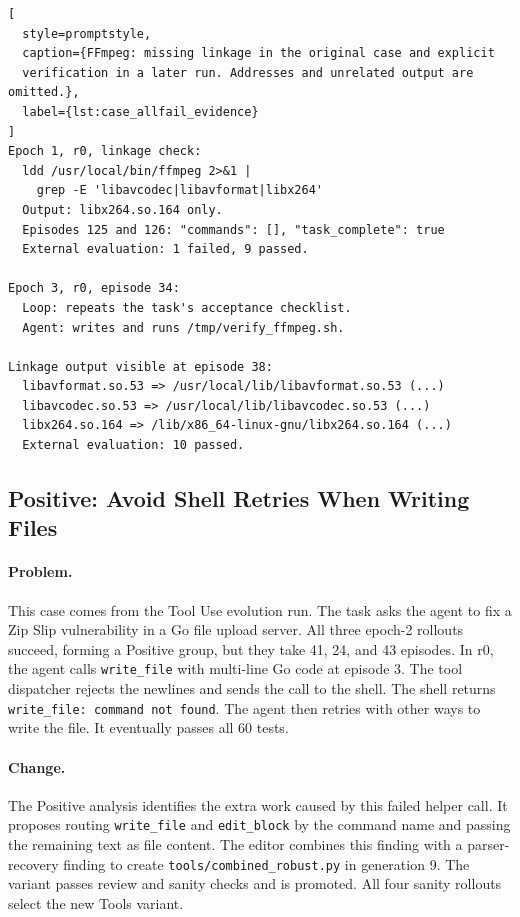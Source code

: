 \documentclass{article} %
\begin{document}
\begin{lstlisting}[
  style=promptstyle,
  caption={FFmpeg: missing linkage in the original case and explicit
  verification in a later run. Addresses and unrelated output are omitted.},
  label={lst:case_allfail_evidence}
]
Epoch 1, r0, linkage check:
  ldd /usr/local/bin/ffmpeg 2>&1 |
    grep -E 'libavcodec|libavformat|libx264'
  Output: libx264.so.164 only.
  Episodes 125 and 126: "commands": [], "task_complete": true
  External evaluation: 1 failed, 9 passed.

Epoch 3, r0, episode 34:
  Loop: repeats the task's acceptance checklist.
  Agent: writes and runs /tmp/verify_ffmpeg.sh.

Linkage output visible at episode 38:
  libavformat.so.53 => /usr/local/lib/libavformat.so.53 (...)
  libavcodec.so.53 => /usr/local/lib/libavcodec.so.53 (...)
  libx264.so.164 => /lib/x86_64-linux-gnu/libx264.so.164 (...)
  External evaluation: 10 passed.
\end{lstlisting}

\subsection{Positive: Avoid Shell Retries When Writing Files}

\paragraph{Problem.}
This case comes from the Tool Use evolution run. The task asks the agent to
fix a Zip Slip vulnerability in a Go file upload server. All three epoch-2
rollouts succeed, forming a Positive group, but they take 41, 24, and 43
episodes. In r0, the agent calls \texttt{write\_file} with multi-line Go code
at episode 3. The tool dispatcher rejects the newlines and sends the call to
the shell. The shell returns \texttt{write\_file: command not found}.
The agent then retries with other ways to write the file. It eventually
passes all 60 tests.

\paragraph{Change.}
The Positive analysis identifies the extra work caused by this failed helper
call. It proposes routing \texttt{write\_file} and \texttt{edit\_block}
by the command name and passing the remaining text as file content.
The editor combines this finding with a parser-recovery finding to create
\texttt{tools/combined\_robust.py} in generation 9.
The variant passes review and sanity checks and is promoted.
All four sanity rollouts select the new Tools variant.
\end{document}
